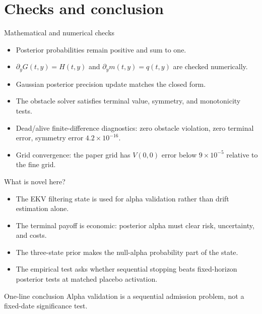 \documentclass[aspectratio=169,10pt]{beamer}
\newcommand{\1}{\mathbf{1}}
\begin{document}
\section{Checks and conclusion}

\begin{frame}{Mathematical and numerical checks}
  \large
  \begin{itemize}
    \item Posterior probabilities remain positive and sum to one.
    \item \(\partial_y G(t,y)=H(t,y)\) and \(\partial_y m(t,y)=q(t,y)\) are checked numerically.
    \item Gaussian posterior precision update matches the closed form.
    \item The obstacle solver satisfies terminal value, symmetry, and monotonicity tests.
    \item Dead/alive finite-difference diagnostics: zero obstacle violation, zero terminal error,
      symmetry error \(4.2\times10^{-16}\).
    \item Grid convergence: the paper grid has \(V(0,0)\) error below \(9\times10^{-5}\)
      relative to the fine grid.
  \end{itemize}
\end{frame}

\begin{frame}{What is novel here?}
  \large
  \begin{itemize}
    \item The EKV filtering state is used for alpha validation rather than drift estimation alone.
    \item The terminal payoff is economic: posterior alpha must clear risk, uncertainty, and costs.
    \item The three-state prior makes the null-alpha probability part of the state.
    \item The empirical test asks whether sequential stopping beats fixed-horizon posterior tests
      at matched placebo activation.
  \end{itemize}

  \vspace{0.8em}
  \begin{block}{One-line conclusion}
    Alpha validation is a sequential admission problem, not a fixed-date significance test.
  \end{block}
\end{frame}
\end{document}
